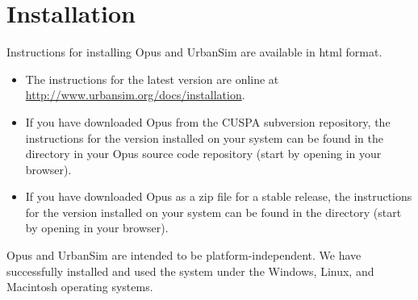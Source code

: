

\chapter{Installation}
\label{chapter:installation}


Instructions for installing Opus and UrbanSim are available in html
format.  

\begin{itemize}

\item The instructions for the latest version are online at
\url{http://www.urbansim.org/docs/installation}.

\item If you have downloaded Opus from the CUSPA subversion repository, the
instructions for the version installed on your system can be found in the
directory  in your Opus source code repository (start
by opening  in your browser).

\item If you have downloaded Opus as a zip file for a stable release, the instructions for the
version installed on your system can be found in the directory
 (start by opening  in your browser).

\end{itemize}

Opus and UrbanSim are intended to be platform-independent.
 We have successfully installed and used the
system under the Windows, \windowsindex Linux, \linuxindex and Macintosh
\macintoshindex operating systems.


